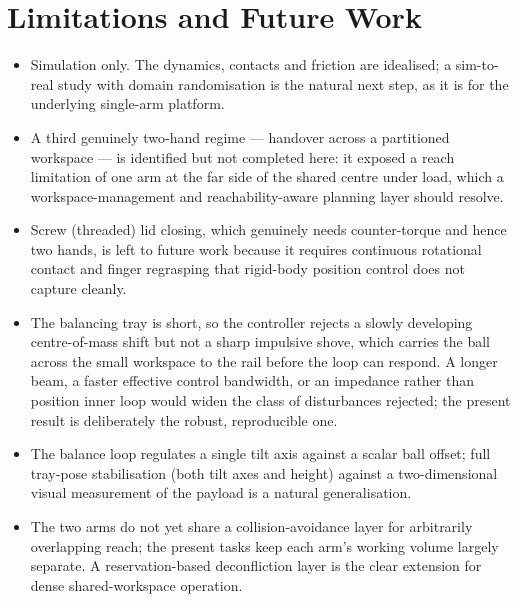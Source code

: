 \documentclass[runningheads]{llncs}
\begin{document}
\section{Limitations and Future Work}
\begin{itemize}

\item Simulation only. The dynamics, contacts and friction are idealised; a sim-to-real study with domain randomisation is the natural next step, as it is for the underlying single-arm platform.

\item A third genuinely two-hand regime --- handover across a partitioned workspace --- is identified but not completed here: it exposed a reach limitation of one arm at the far side of the shared centre under load, which a workspace-management and reachability-aware planning layer should resolve.

\item Screw (threaded) lid closing, which genuinely needs counter-torque and hence two hands, is left to future work because it requires continuous rotational contact and finger regrasping that rigid-body position control does not capture cleanly.

\item The balancing tray is short, so the controller rejects a slowly developing centre-of-mass shift but not a sharp impulsive shove, which carries the ball across the small workspace to the rail before the loop can respond. A longer beam, a faster effective control bandwidth, or an impedance rather than position inner loop would widen the class of disturbances rejected; the present result is deliberately the robust, reproducible one.

\item The balance loop regulates a single tilt axis against a scalar ball offset; full tray-pose stabilisation (both tilt axes and height) against a two-dimensional visual measurement of the payload is a natural generalisation.

\item The two arms do not yet share a collision-avoidance layer for arbitrarily overlapping reach; the present tasks keep each arm's working volume largely separate. A reservation-based deconfliction layer is the clear extension for dense shared-workspace operation.

\end{itemize}
\end{document}
